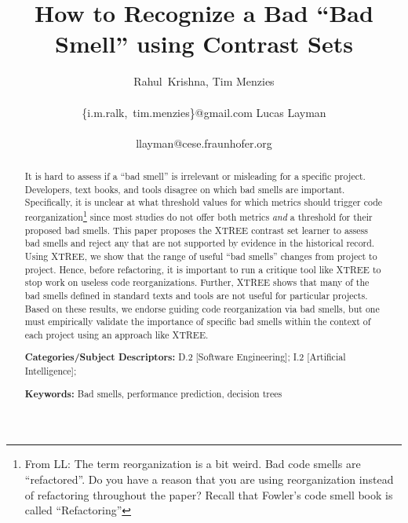 \documentclass{sig-alternate}
\begin{document}
  


\title{  How to Recognize  a Bad  ``Bad Smell'' using Contrast Sets}
\author{  
\alignauthor
Rahul~Krishna, Tim Menzies  \\
       \\
       {\{i.m.ralk,~tim.menzies\}@gmail.com}
\alignauthor
Lucas Layman \\
       \\ 
       {llayman@cese.fraunhofer.org}
\setlength{\columnsep}{7mm}}
\maketitle
\begin{abstract} 
It is hard to assess
if a ``bad smell'' is irrelevant or misleading
for a specific project.
Developers, text books, and tools
disagree on which bad smells are important. 
Specifically, it is unclear at what threshold values
for which metrics should trigger code reorganization\footnote{From LL: The term reorganization is a bit weird. Bad code smells are ``refactored''. Do you have a reason that you are using reorganization instead of refactoring throughout the paper? Recall that Fowler's code smell book is called ``Refactoring''} since
most studies do not offer
both metrics {\em and} a threshold for their proposed bad smells.
This paper proposes the XTREE contrast set
learner to assess bad smells
and reject any that are not supported by
evidence in the historical record.  
Using XTREE, we   show that the range of useful
``bad smells'' changes from project to project. Hence,
before refactoring, it is important to run a critique tool
like XTREE to stop work on useless code reorganizations.
Further, XTREE shows that many
of the bad smells defined in standard texts and tools
are not useful for particular projects. 
Based on these results, we endorse  
guiding code reorganization via bad smells, but one must empirically validate the importance of specific bad smells within the context of each project using an approach like XTREE.

 
{\bf Categories/Subject Descriptors:} D.2 [Software Engineering]; I.2 [Artificial Intelligence];

 
{\bf Keywords:} Bad smells,
performance prediction,  decision trees 
\end{abstract}
\end{document}
